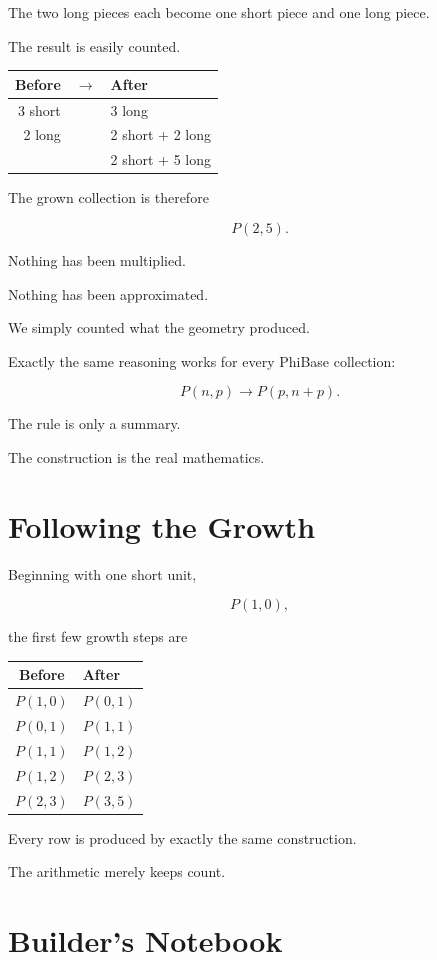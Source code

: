 The two long pieces each become one short piece and one long piece.

The result is easily counted.

\begin{center}
\begin{tabular}{rcl}
Before & $\longrightarrow$ & After \\
\hline
3 short & & 3 long \\
2 long  & & 2 short + 2 long \\
\hline
         & & 2 short + 5 long
\end{tabular}
\end{center}

The grown collection is therefore

\[
P(2,5).
\]

Nothing has been multiplied.

Nothing has been approximated.

We simply counted what the geometry produced.

Exactly the same reasoning works for every PhiBase collection:

\[
P(n,p)\longrightarrow P(p,n+p).
\]

The rule is only a summary.

The construction is the real mathematics.

\section*{Following the Growth}

Beginning with one short unit,

\[
P(1,0),
\]

the first few growth steps are

\begin{center}
\begin{tabular}{cl}
Before & After \\
\hline
$P(1,0)$ & $P(0,1)$ \\
$P(0,1)$ & $P(1,1)$ \\
$P(1,1)$ & $P(1,2)$ \\
$P(1,2)$ & $P(2,3)$ \\
$P(2,3)$ & $P(3,5)$
\end{tabular}
\end{center}

Every row is produced by exactly the same construction.

The arithmetic merely keeps count.

\section*{Builder's Notebook}

